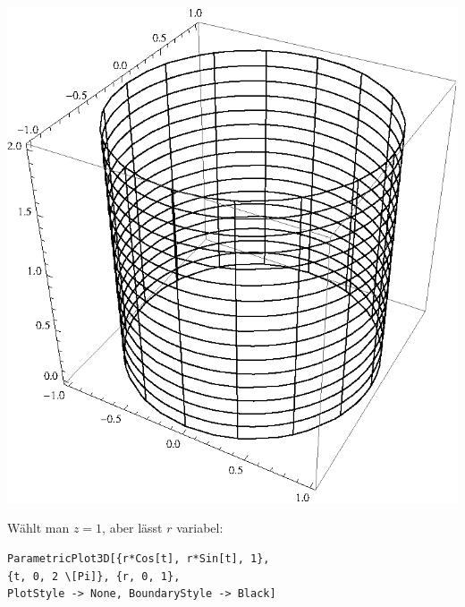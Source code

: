 \documentclass[10pt,a4paper]{scrartcl}
\begin{document}
\begin{enumerate}[(i)]
\begin{minipage}{0.50\columnwidth}
$\qquad$\includegraphics[scale=0.7]{1iv.eps} 
\end{minipage}
\begin{minipage}{0.50\columnwidth}
Wählt man $z = 1$, aber lässt $r$ variabel:
\begin{lstlisting}[caption= Mathematica Code für den Graph von Z]
ParametricPlot3D[{r*Cos[t], r*Sin[t], 1}, 
{t, 0, 2 \[Pi]}, {r, 0, 1}, 
PlotStyle -> None, BoundaryStyle -> Black]
\end{lstlisting}
\end{minipage}
\begin{minipage}{0.50\columnwidth}

\end{minipage}
\end{enumerate}
\end{document}
